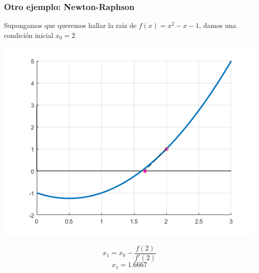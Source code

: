 \documentclass[xcolor=svgnames]{beamer} %
\theoremstyle{plain}
\theoremstyle{definition}
\begin{document}
\begin{frame}
	\frametitle{Otro ejemplo: Newton-Raphson}

Supongamos que queremos hallar la raiz de $f(x) = x^2-x-1$,
damos una condición inicial $x_0=2$


\begin{minipage}{.7\linewidth}
\includegraphics[width=\linewidth]{nr_example2/iter1.png} 

\end{minipage}  \begin{minipage}{.25\linewidth}

$$ x_1 = x_0 - \frac{f(2)}{f'(2)}$$
$$ x_1 = 1.6667$$
\end{minipage}

\end{frame}
\end{document}
